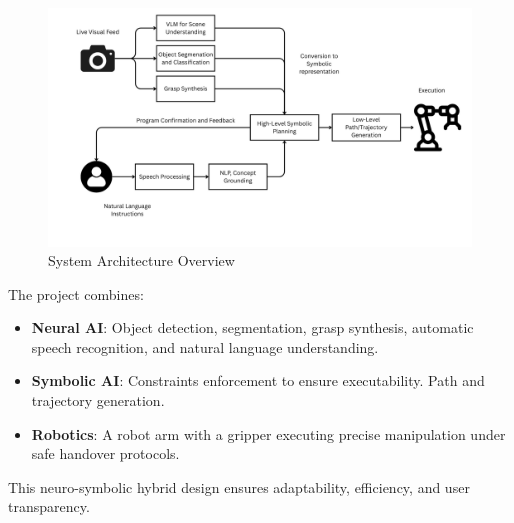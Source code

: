 \documentclass[12pt]{extarticle}
\begin{document}
\begin{figure}[H]
    \centering
    \includegraphics[width=\linewidth]{images/System_Architecture_Overview.png}
    \caption{System Architecture Overview}
    \label{fig: architecture overview}
\end{figure}

The project combines:
\begin{itemize}
    \item \textbf{Neural AI}: Object detection, segmentation, grasp synthesis, automatic speech recognition, and natural language understanding.
    \item \textbf{Symbolic AI}: Constraints enforcement to ensure executability. Path and trajectory generation.
    \item \textbf{Robotics}: A robot arm with a gripper executing precise manipulation under safe handover protocols. 
\end{itemize}
This neuro-symbolic hybrid design ensures adaptability, efficiency, and user transparency. \\
\end{document}
